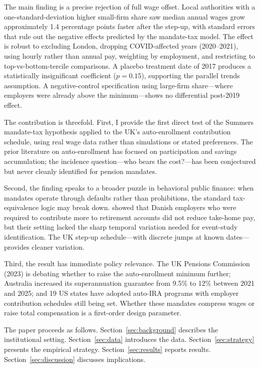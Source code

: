 \documentclass[12pt]{article}
\begin{document}
The main finding is a precise rejection of full wage offset. Local authorities with a one-standard-deviation higher small-firm share saw median annual wages grow approximately 1.4 percentage points faster after the step-up, with standard errors that rule out the negative effects predicted by the mandate-tax model. The effect is robust to excluding London, dropping COVID-affected years (2020--2021), using hourly rather than annual pay, weighting by employment, and restricting to top-vs-bottom-tercile comparisons. A placebo treatment date of 2017 produces a statistically insignificant coefficient ($p = 0.15$), supporting the parallel trends assumption. A negative-control specification using large-firm share---where employers were already above the minimum---shows no differential post-2019 effect.

The contribution is threefold. First, I provide the first direct test of the Summers mandate-tax hypothesis applied to the UK's auto-enrollment contribution schedule, using real wage data rather than simulations or stated preferences. The prior literature on auto-enrollment \citep{madrian2001,chetty2014,cribb2016} has focused on participation and savings accumulation; the incidence question---who bears the cost?---has been conjectured but never cleanly identified for pension mandates.

Second, the finding speaks to a broader puzzle in behavioral public finance: when mandates operate through defaults rather than prohibitions, the standard tax-equivalence logic may break down. \citet{chetty2014} showed that Danish employers who were required to contribute more to retirement accounts did not reduce take-home pay, but their setting lacked the sharp temporal variation needed for event-study identification. The UK step-up schedule---with discrete jumps at known dates---provides cleaner variation.

Third, the result has immediate policy relevance. The UK Pensions Commission (2023) is debating whether to raise the auto-enrollment minimum further; Australia increased its superannuation guarantee from 9.5\% to 12\% between 2021 and 2025; and 19 US states have adopted auto-IRA programs with employer contribution schedules still being set. Whether these mandates compress wages or raise total compensation is a first-order design parameter.

The paper proceeds as follows. Section~\ref{sec:background} describes the institutional setting. Section~\ref{sec:data} introduces the data. Section~\ref{sec:strategy} presents the empirical strategy. Section~\ref{sec:results} reports results. Section~\ref{sec:discussion} discusses implications.
\end{document}
